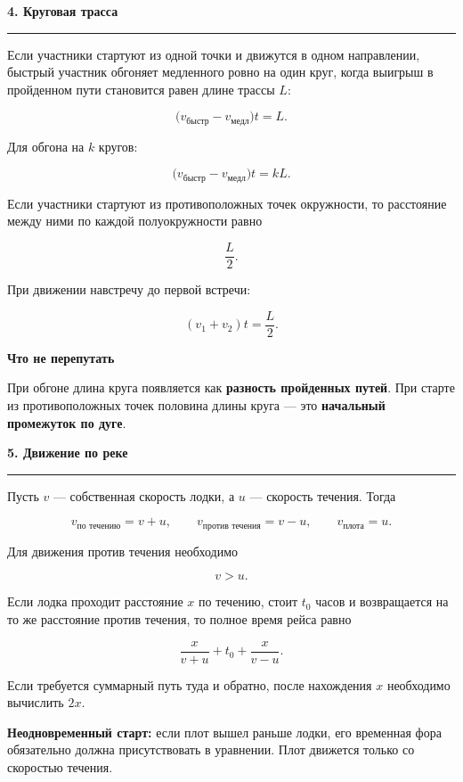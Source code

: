 \documentclass[a4paper,12pt]{article}
\newcommand{\sect}[1]{%
    \vspace{0.35em}%
    {\Large\bfseries\color{darkaccent}#1}\par
    \vspace{0.22em}%
    \color{linegray}\hrule
    \color{textgray}%
    \vspace{0.55em}%
}
\newcommand{\subsect}[1]{%
    \vspace{0.3em}%
    {\large\bfseries\color{accent}#1}\par
    \vspace{0.18em}%
}
\newcommand{\important}[1]{\textbf{\color{darkaccent}#1}}
\begin{document}

\sect{4. Круговая трасса}

Если участники стартуют из одной точки и движутся в одном направлении,
быстрый участник обгоняет медленного ровно на один круг,
когда выигрыш в пройденном пути становится равен длине трассы $L$:

\[
\bigl(v_{\text{быстр}}-v_{\text{медл}}\bigr)t=L.
\]

Для обгона на $k$ кругов:

\[
\bigl(v_{\text{быстр}}-v_{\text{медл}}\bigr)t=kL.
\]

Если участники стартуют из противоположных точек окружности,
то расстояние между ними по каждой полуокружности равно

\[
\frac{L}{2}.
\]

При движении навстречу до первой встречи:

\[
(v_1+v_2)t=\frac{L}{2}.
\]

\subsect{Что не перепутать}

При обгоне длина круга появляется как
\important{разность пройденных путей}.
При старте из противоположных точек половина длины круга --- это
\important{начальный промежуток по дуге}.


\sect{5. Движение по реке}

Пусть $v$ --- собственная скорость лодки,
а $u$ --- скорость течения. Тогда

\[
v_{\text{по течению}}=v+u,
\qquad
v_{\text{против течения}}=v-u,
\qquad
v_{\text{плота}}=u.
\]

Для движения против течения необходимо

\[
v>u.
\]

Если лодка проходит расстояние $x$ по течению,
стоит $t_0$ часов и возвращается на то же расстояние против течения,
то полное время рейса равно

\[
\frac{x}{v+u}+t_0+\frac{x}{v-u}.
\]

Если требуется суммарный путь туда и обратно,
после нахождения $x$ необходимо вычислить $2x$.

\important{Неодновременный старт:}
если плот вышел раньше лодки, его временная фора обязательно должна
присутствовать в уравнении. Плот движется только со скоростью течения.
\end{document}

